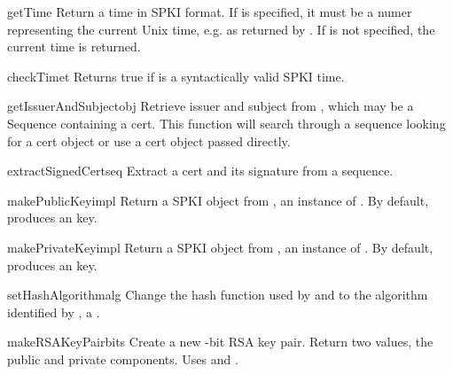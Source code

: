 \documentclass{howto}
\begin{document}
\begin{funcdesc}{getTime}{}
Return a time in SPKI format.  If  is specified, it must be a
numer representing the current Unix time, e.g. as returned by
.  If  is not specified, the current time
is returned.
\end{funcdesc}

\begin{funcdesc}{checkTime}{t}
Returns true if  is a syntactically valid SPKI time.
\end{funcdesc}

\begin{funcdesc}{getIssuerAndSubject}{obj}
Retrieve issuer and subject from , which may be a Sequence
containing a cert.  This function will search through a sequence
looking for a cert object or use a cert object passed directly.
\end{funcdesc}

\begin{funcdesc}{extractSignedCert}{seq}
Extract a cert and its signature from a sequence.
\end{funcdesc}

\begin{funcdesc}{makePublicKey}{impl}
Return a  SPKI object from , an instance of
.  By default, produces an
 key.
\end{funcdesc}

\begin{funcdesc}{makePrivateKey}{impl}
Return a  SPKI object from , an instance of
.   By default, produces an
 key. 
\end{funcdesc}

\begin{funcdesc}{setHashAlgorithm}{alg}
Change the hash function used by  and
 to the algorithm identified by , a
. 
\end{funcdesc}

\begin{funcdesc}{makeRSAKeyPair}{bits}
Create a new -bit RSA key pair.  Return two values, the
public and private components.  Uses  and
.
\end{funcdesc}
\end{document}
